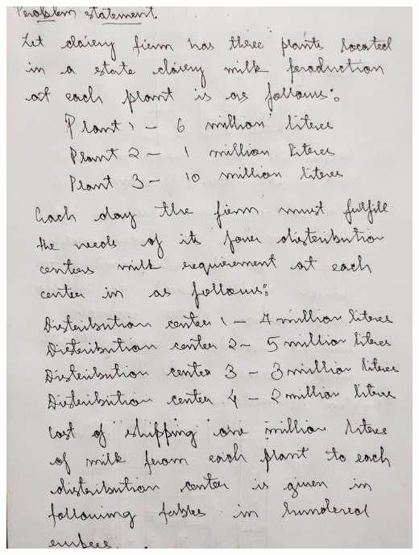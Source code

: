 \documentclass[12pt, letterpaper, twoside]{book}
\begin{document}
\begin{flushleft}
\includegraphics[width=\paperwidth, height=10in]{Page1}
\end{flushleft}
\end{document}
